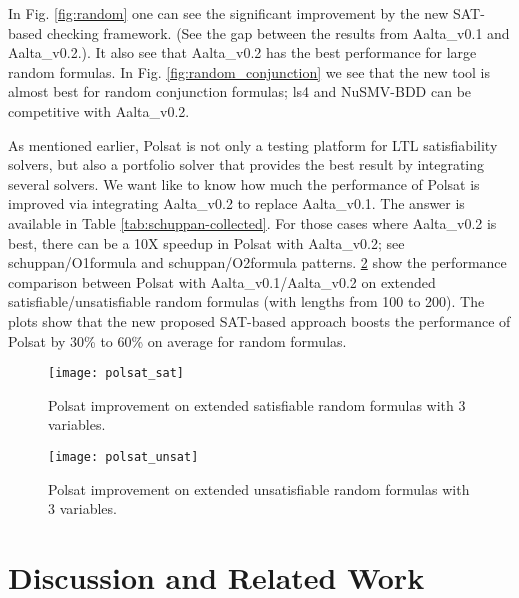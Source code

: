 \documentclass[conference]{IEEEtran}
\def\Aalta{{Aalta}}
\begin{document}
In Fig. \ref{fig:random} one can see the significant improvement 
by the new SAT-based checking framework. (See the gap between the results 
from \Aalta\_v0.1 and \Aalta\_v0.2.). It also see that \Aalta\_v0.2 has 
the best performance for large random formulas. 
In Fig. \ref{fig:random_conjunction} we see that the new tool is almost
best for random conjunction formulas; ls4 and NuSMV-BDD can be competitive
with \Aalta\_v0.2. 

As mentioned earlier, Polsat is not only a testing platform for LTL 
satisfiability solvers, but also a portfolio solver that provides the best 
result by integrating several solvers. We want like to know  how much the 
performance of Polsat is improved via integrating \Aalta\_v0.2 to replace 
\Aalta\_v0.1.  The answer is available in 
Table \ref{tab:schuppan-collected}. For those cases where \Aalta\_v0.2 is
best, there can be a 10X speedup in Polsat with \Aalta\_v0.2;
see \textsf{schuppan/O1formula} and \textsf{schuppan/O2formula} patterns.
\ref{fig:polsat_unsat} show the performance comparison between Polsat with 
\Aalta\_v0.1/\Aalta\_v0.2 on extended satisfiable/unsatisfiable random 
formulas (with lengths from 100 to 200). 
The plots show that the new proposed SAT-based approach boosts the 
performance of Polsat  by 30\% to 60\% on average for random formulas. 

\begin{figure}
\centering
\texttt{[image: polsat\_sat]}
\caption{Polsat improvement on extended satisfiable random formulas with 3 variables.}
\label{fig:polsat_sat}
\end{figure}

\begin{figure}
\centering
\texttt{[image: polsat\_unsat]}
\caption{Polsat improvement on extended unsatisfiable random formulas with 3 variables.}
\label{fig:polsat_unsat}
\end{figure}


\section{Discussion and Related Work}\label{sec:related} 
\end{document}
